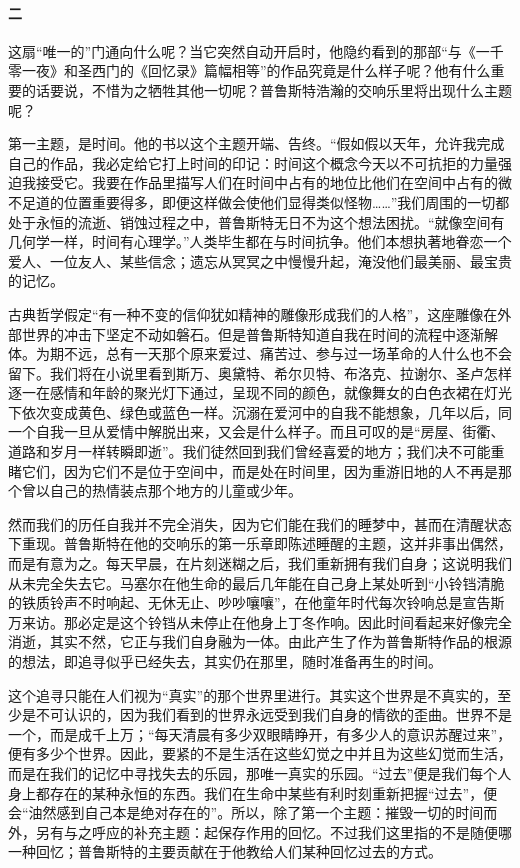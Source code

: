 \paragraph*{二}
\par 这扇“唯一的”门通向什么呢？当它突然自动开启时，他隐约看到的那部“与《一千零一夜》和圣西门的《回忆录》篇幅相等”的作品究竟是什么样子呢？他有什么重要的话要说，不惜为之牺牲其他一切呢？普鲁斯特浩瀚的交响乐里将出现什么主题呢？
\par 第一主题，是时间。他的书以这个主题开端、告终。“假如假以天年，允许我完成自己的作品，我必定给它打上时间的印记：时间这个概念今天以不可抗拒的力量强迫我接受它。我要在作品里描写人们在时间中占有的地位比他们在空间中占有的微不足道的位置重要得多，即便这样做会使他们显得类似怪物……”我们周围的一切都处于永恒的流逝、销蚀过程之中，普鲁斯特无日不为这个想法困扰。“就像空间有几何学一样，时间有心理学。”人类毕生都在与时间抗争。他们本想执著地眷恋一个爱人、一位友人、某些信念；遗忘从冥冥之中慢慢升起，淹没他们最美丽、最宝贵的记忆。
\par 古典哲学假定“有一种不变的信仰犹如精神的雕像形成我们的人格”，这座雕像在外部世界的冲击下坚定不动如磐石。但是普鲁斯特知道自我在时间的流程中逐渐解体。为期不远，总有一天那个原来爱过、痛苦过、参与过一场革命的人什么也不会留下。我们将在小说里看到斯万、奥黛特、希尔贝特、布洛克、拉谢尔、圣卢怎样逐一在感情和年龄的聚光灯下通过，呈现不同的颜色，就像舞女的白色衣裙在灯光下依次变成黄色、绿色或蓝色一样。沉溺在爱河中的自我不能想象，几年以后，同一个自我一旦从爱情中解脱出来，又会是什么样子。而且可叹的是“房屋、街衢、道路和岁月一样转瞬即逝”。我们徒然回到我们曾经喜爱的地方；我们决不可能重睹它们，因为它们不是位于空间中，而是处在时间里，因为重游旧地的人不再是那个曾以自己的热情装点那个地方的儿童或少年。
\par 然而我们的历任自我并不完全消失，因为它们能在我们的睡梦中，甚而在清醒状态下重现。普鲁斯特在他的交响乐的第一乐章即陈述睡醒的主题，这并非事出偶然，而是有意为之。每天早晨，在片刻迷糊之后，我们重新拥有我们自身；这说明我们从未完全失去它。马塞尔在他生命的最后几年能在自己身上某处听到“小铃铛清脆的铁质铃声不时响起、无休无止、吵吵嚷嚷”，在他童年时代每次铃响总是宣告斯万来访。那必定是这个铃铛从未停止在他身上丁冬作响。因此时间看起来好像完全消逝，其实不然，它正与我们自身融为一体。由此产生了作为普鲁斯特作品的根源的想法，即追寻似乎已经失去，其实仍在那里，随时准备再生的时间。
\par 这个追寻只能在人们视为“真实”的那个世界里进行。其实这个世界是不真实的，至少是不可认识的，因为我们看到的世界永远受到我们自身的情欲的歪曲。世界不是一个，而是成千上万；“每天清晨有多少双眼睛睁开，有多少人的意识苏醒过来”，便有多少个世界。因此，要紧的不是生活在这些幻觉之中并且为这些幻觉而生活，而是在我们的记忆中寻找失去的乐园，那唯一真实的乐园。“过去”便是我们每个人身上都存在的某种永恒的东西。我们在生命中某些有利时刻重新把握“过去”，便会“油然感到自己本是绝对存在的”。所以，除了第一个主题：摧毁一切的时间而外，另有与之呼应的补充主题：起保存作用的回忆。不过我们这里指的不是随便哪一种回忆；普鲁斯特的主要贡献在于他教给人们某种回忆过去的方式。
